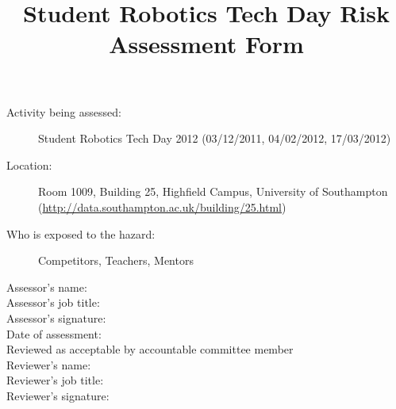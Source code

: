 \documentclass[12pt,a4paper]{scrartcl}
\title{Student Robotics Tech Day Risk Assessment Form}
\begin{document}
\maketitle

\begin{description}
\item[Activity being assessed:] Student Robotics Tech Day 2012 (03/12/2011, 04/02/2012, 17/03/2012)
\item[Location:] Room 1009, Building 25, Highfield Campus, University of Southampton (\url{http://data.southampton.ac.uk/building/25.html})
\item[Who is exposed to the hazard:] Competitors, Teachers, Mentors
\end{description}

\begin{description}
\item[Assessor's name:]
\item[Assessor's job title:]
\item[Assessor's signature:]
\item[Date of assessment:]
\item [Reviewed as acceptable by accountable committee member]
\item[Reviewer's name:]
\item[Reviewer's job title:]
\item[Reviewer's signature:]
\end{description}
\clearpage

\newcommand{\risk}[3]{
 #1 & #2 & #3 \\
}
\end{document}

